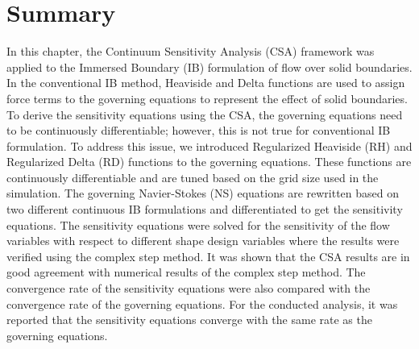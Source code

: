 


\section{Summary}
In this chapter, the Continuum Sensitivity Analysis (CSA) framework was applied to the Immersed Boundary (IB) formulation of flow over solid boundaries. In the conventional IB method, Heaviside and Delta functions are used to assign force terms to the governing equations to represent the effect of solid boundaries. To derive the sensitivity equations using the CSA, the governing equations need to be continuously differentiable; however, this is not true for conventional IB formulation. To address this issue, we introduced Regularized Heaviside (RH) and Regularized Delta (RD) functions to the governing equations. These functions are continuously differentiable and are tuned based on the grid size used in the simulation. The governing Navier-Stokes (NS) equations are rewritten based on two different continuous IB formulations and differentiated to get the sensitivity equations. The sensitivity equations were solved for the sensitivity of the flow variables with respect to different shape design variables where the results were verified using the complex step method. It was shown that the CSA results are in good agreement with numerical results of the complex step method. The convergence rate of the sensitivity equations were also compared with the convergence rate of the governing equations. For the conducted analysis, it was reported that the sensitivity equations converge with the same rate as the governing equations.